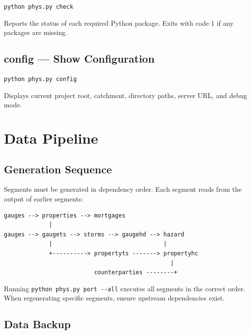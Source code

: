 \documentclass[11pt,a4paper]{article}
\begin{document}
\begin{lstlisting}[language=bash]
python phys.py check
\end{lstlisting}

Reports the status of each required Python package. Exits with code 1 if any
packages are missing.

\subsection{config --- Show Configuration}

\begin{lstlisting}[language=bash]
python phys.py config
\end{lstlisting}

Displays current project root, catchment, directory paths, server URL, and
debug mode.

\section{Data Pipeline}
\label{sec:pipeline}

\subsection{Generation Sequence}

Segments must be generated in dependency order. Each segment reads from the
output of earlier segments:

\begin{lstlisting}[language={},caption={Data pipeline dependency chain}]
gauges --> properties --> mortgages
             |
gauges --> gaugets --> storms --> gaugehd --> hazard
             |                                |
             +----------> propertyts -------> propertyhc
                                                |
                          counterparties --------+
\end{lstlisting}

Running \texttt{python phys.py port -{}-all} executes all segments in the
correct order. When regenerating specific segments, ensure upstream
dependencies exist.

\subsection{Data Backup}
\end{document}
